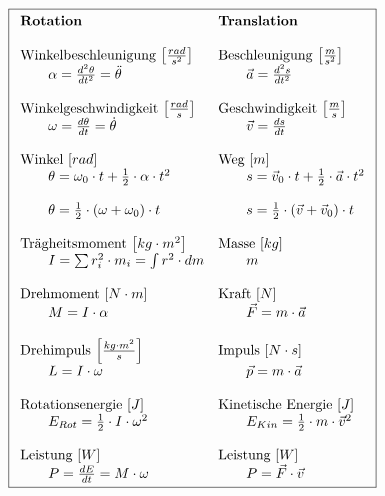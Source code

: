 \[ \boxed{\begin{array}{l l}
\textbf{Rotation} & \textbf{Translation} \\
& \\
\text{Winkelbeschleunigung $\left[\frac{rad}{s^2}\right]$}
	& \text{Beschleunigung $\left[\frac{m}{s^2}\right]$} \\
		\qquad \alpha = \frac{d^2\theta}{dt^2} = \ddot{\theta}
			& \qquad \vec{a} = \frac{d^2s}{dt^2} \\
& \\
\text{Winkelgeschwindigkeit $\left[\frac{rad}{s}\right]$} 
	& \text{Geschwindigkeit $\left[\frac{m}{s}\right]$} \\
		\qquad \omega = \frac{d\theta}{dt} = \dot{\theta} 
			& \qquad \vec{v} = \frac{ds}{dt} \\
& \\
\text{Winkel $\left[rad\right]$} 
	& \text{Weg $\left[ m \right]$} \\
		\qquad \theta = \omega_0 \cdot t + \frac{1}{2} \cdot \alpha \cdot t^2
			& \qquad s = \vec{v}_0 \cdot t + \frac{1}{2} \cdot \vec{a} \cdot t^2 \\
		& \\
		\qquad \theta = \frac{1}{2} \cdot (\omega + \omega_0) \cdot t
			& \qquad s = \frac{1}{2} \cdot (\vec{v} + \vec{v}_0) \cdot t \\
& \\
\text{Trägheitsmoment $\left[kg \cdot m^2\right]$} 
	& \text{Masse $\left[kg\right]$} \\
		\qquad I = \sum r_i^2 \cdot m_i = \int r^2 \cdot dm
			& \qquad m \\
& \\
\text{Drehmoment $\left[N \cdot m\right]$}
	& \text{Kraft $\left[N\right]$} \\
		\qquad M = I \cdot \alpha
			& \qquad \vec{F} = m \cdot \vec{a} \\
& \\
\text{Drehimpuls $\left[\frac{kg \cdot m^2}{s}\right]$} 
	& \text{Impuls $\left[N \cdot s\right]$} \\
		\qquad L = I \cdot \omega
			& \qquad \vec{p} = m \cdot \vec{a} \\
& \\
\text{Rotationsenergie $\left[J\right]$} 
	& \text{Kinetische Energie $\left[J\right]$} \\
		\qquad E_{Rot} = \frac{1}{2} \cdot I \cdot \omega^2
			& \qquad E_{Kin} = \frac{1}{2} \cdot m \cdot \vec{v}^2 \\
& \\
\text{Leistung $\left[W\right]$}
	& \text{Leistung $\left[W\right]$} \\
		\qquad P = \frac{dE}{dt} = M \cdot \omega 
			& \qquad P = \vec{F} \cdot \vec{v}
\end{array} } \]


